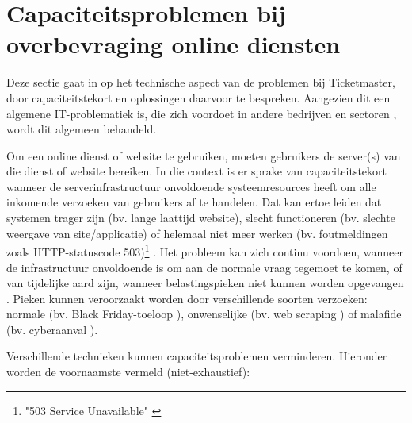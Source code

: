 
\section{Capaciteitsproblemen bij overbevraging online diensten}

Deze sectie gaat in op het technische aspect van de problemen bij Ticketmaster,
door capaciteitstekort en oplossingen daarvoor te bespreken. Aangezien dit
een algemene IT-problematiek is, die zich voordoet in andere bedrijven en
sectoren \cite{warren2023chatgpt, warren2020discord, reuters2023what},
wordt dit algemeen behandeld. 

Om een online dienst of website te gebruiken, moeten gebruikers de
server(s) van die dienst of website bereiken. In die context is er sprake van
capaciteitstekort wanneer de serverinfrastructuur onvoldoende systeemresources
heeft om alle inkomende verzoeken van gebruikers af te handelen.
Dat kan ertoe leiden dat systemen trager zijn (bv. lange laattijd website),
slecht functioneren (bv. slechte weergave van site/applicatie) of
helemaal niet meer werken (bv. foutmeldingen zoals HTTP-statuscode
503)\footnote{"503 Service Unavailable" \cite{fielding2022http}}
\cite{guitart2010survey, guitart2007designing}.
Het probleem kan zich continu voordoen, wanneer de infrastructuur onvoldoende
is om aan de normale vraag tegemoet te komen,
of van tijdelijke aard zijn, wanneer belastingspieken niet kunnen worden
opgevangen \cite{schroeder2006web}. Pieken kunnen veroorzaakt worden
door verschillende soorten verzoeken:
normale (bv. Black Friday-toeloop \cite{iyer2001overload}),
onwenselijke (bv. web scraping \cite{thelwall2006web}) of
malafide (bv. cyberaanval \cite{loukas2009protection}).

Verschillende technieken kunnen capaciteitsproblemen verminderen.
Hieronder worden de voornaamste vermeld (niet-exhaustief):

